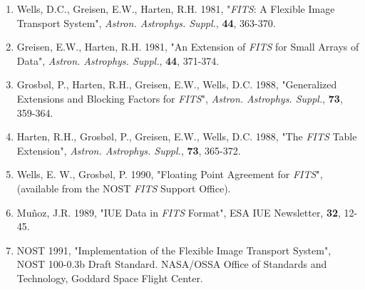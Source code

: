 \begin{enumerate}
 \item Wells, D.C., Greisen, E.W., Harten, R.H. 1981,
      "{\sl FITS}: A Flexible Image Transport System",
      {\sl Astron. Astrophys. Suppl.}, {\bf 44}, 363-370.
 \item Greisen, E.W., Harten, R.H. 1981,
      "An Extension of {\sl FITS} for Small Arrays of Data",
      {\sl Astron. Astrophys. Suppl.}, {\bf 44}, 371-374.
 \item Grosb\o l, P., Harten, R.H., Greisen, E.W., Wells, D.C. 1988,
      "Generalized Extensions and Blocking Factors for {\sl FITS}",
      {\sl Astron. Astrophys. Suppl.}, {\bf 73}, 359-364.
 \item Harten, R.H., Grosb\o l, P., Greisen, E.W., Wells, D.C. 1988,
      "The {\sl FITS} Table Extension",
      {\sl Astron. Astrophys. Suppl.}, {\bf 73}, 365-372.
 \item Wells, E. W., Grosb\o l, P. 1990, 
       "Floating Point Agreement for {\sl FITS}",
       (available from the NOST {\sl FITS} Support Office).
 \item Mu\~{n}oz, J.R. 1989, 
       "IUE Data in {\sl FITS} Format",
       ESA IUE Newsletter, {\bf 32}, 12-45.
 \item NOST 1991,
       "Implementation of the Flexible Image Transport System",
       NOST 100-0.3b Draft Standard.
       NASA/OSSA Office of Standards and Technology, 
       Goddard Space Flight Center.
\end{enumerate}


